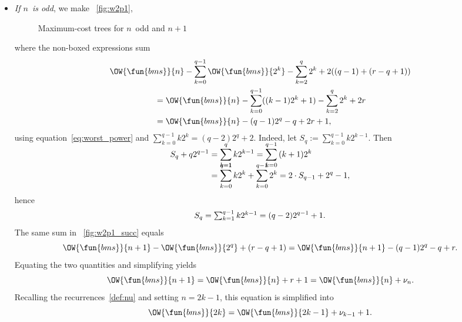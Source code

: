 \begin{itemize}
  \item \emph{If \(n\)~is odd}, we make
    \fig~\vref{fig:w2p1},
\begin{figure}[t]
\centering
{}
\qquad
{}
\caption{Maximum-cost trees for \(n\)~odd and \(n+1\)}
\label{fig:Wn_odd}
\end{figure}
    where the non\hyp{}boxed expressions sum
    \begin{multline*}
      \OW{\fun{bms}}{n} - \sum_{k=0}^{q-1}\OW{\fun{bms}}{2^k} -
      \sum_{k=2}^{q}2^k + 2((q-1)+(r-q+1))\\
      \begin{aligned}
        & = \OW{\fun{bms}}{n} - \sum_{k=0}^{q-1}((k-1)2^{k}+1)
        - \sum_{k=2}^{q}2^k + 2r\\
        & = \OW{\fun{bms}}{n} - (q-1)2^q - q + 2r + 1,
      \end{aligned}
    \end{multline*}
    using equation~\eqref{eq:worst_power} and \(\sum_{k=0}^{q-1}k2^k =
    (q-2)2^{q}+2\). Indeed, let \(S_{q} :=
    \sum_{k=0}^{q-1}{k2^{k-1}}\). Then
    \begin{align*}
      S_{q} + q2^{q-1} & = \smash[t]{\sum_{k=1}^{q}{k2^{k-1}}}
      = \smash[t]{\sum_{k=0}^{q-1}{(k+1)2^{k}}} \\
      & = \smash[t]{\sum_{k=0}^{q-1}{k2^{k}}} + \smash[t]{\sum_{k=0}^{q-1}{2^{k}}}
      = 2 \cdot S_{q-1} + 2^{q} - 1,
    \end{align*}
    hence
    \begin{equation}
      \abovedisplayskip=4pt
      \belowdisplayskip=4pt
      S_{q} = \smash[t]{\textstyle\sum_{k=1}^{q-1}{k2^{k-1}}} =
      (q-2)2^{q-1} + 1.
      \label{eq:Sj}
    \end{equation}
    The same sum in \fig~\ref{fig:w2p1_succ}
    equals
    \begin{equation*}
      \OW{\fun{bms}}{n+1} - \OW{\fun{bms}}{2^q} + (r-q+1) =
      \OW{\fun{bms}}{n+1} - (q-1)2^{q} - q + r.
    \end{equation*}
    Equating the two quantities and simplifying yields
    \begin{equation*}
      \OW{\fun{bms}}{n+1} = \OW{\fun{bms}}{n} + r + 1=
      \OW{\fun{bms}}{n} + \nu_n.
    \end{equation*}
    Recalling the recurrences~\eqref{def:nu}  and
    setting \(n=2k-1\), this equation is simplified into
    \begin{equation}
      \OW{\fun{bms}}{2k} = \OW{\fun{bms}}{2k-1} + \nu_{k-1} + 1.
      \label{eq:OWbms_2k}
    \end{equation}

\end{itemize}
